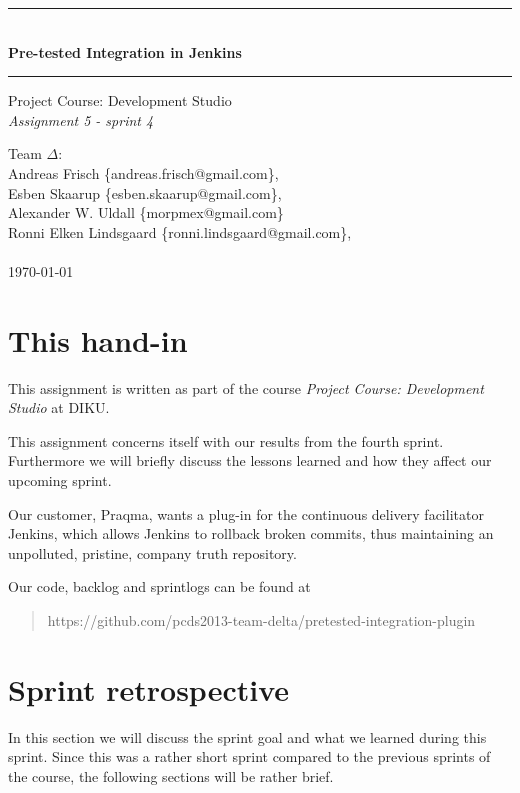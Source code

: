 \documentclass[a4paper,11pt]{article}
\makeatletter
\newcommand{\systemname}{Pre-tested Integration in Jenkins}
\newcommand{\groupname}{Team $\Delta$}
\newcommand{\groupmembers}{
	Andreas Frisch \{andreas.frisch@gmail.com\}, \\
	Esben Skaarup \{esben.skaarup@gmail.com\}, \\
	Alexander W. Uldall \{morpmex@gmail.com\} \\
	Ronni Elken Lindsgaard \{ronni.lindsgaard@gmail.com\}, \\
	~
}
\makeatother
\begin{document}
\begin{titlepage}
	\begin{center}
		\vspace*{4cm}
		\rule{\linewidth}{0.5mm}\\[0.4cm]
		{\huge \bfseries \systemname}
		\rule{\linewidth}{0.5mm}
	\end{center}
	\begin{flushleft}
		{
			\Large Project Course: Development Studio \\[0.1cm]
			{\it Assignment 5 - sprint 4}
		}
	\end{flushleft}
	\vspace*{4cm}
	
	\begin{flushleft}
		{\Large \groupname :} \\[0.1cm]
		{\Large \groupmembers} \\[0.3cm]
		{\Large \today}
	\end{flushleft}
\end{titlepage}
\newpage
\onehalfspacing
\setcounter{tocdepth}{2}

\section{This hand-in}
This assignment is written as part of the course {\it Project Course: Development Studio} at DIKU.

This assignment concerns itself with our results from the fourth sprint.
Furthermore we will briefly discuss the lessons learned and how they affect our
upcoming sprint.

Our customer, Praqma, wants a plug-in for the continuous delivery facilitator
Jenkins, which allows Jenkins to rollback broken commits, thus maintaining an
unpolluted, pristine, company truth repository.

Our code, backlog and sprintlogs can be found at
\begin{quote}
	https://github.com/pcds2013-team-delta/pretested-integration-plugin
\end{quote}

\section{Sprint retrospective}
\label{sec:sprint_retrospective}
In this section we will discuss the sprint goal and what we learned during this
sprint. Since this was a rather short sprint compared to the previous sprints of
the course, the following sections will be rather brief.
\end{document}
